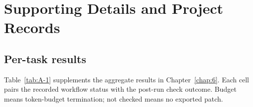 \chapter{Supporting Details and Project Records}\label{app:artefacts}

\section{Per-task results}\label{per-task-results}

Table~\ref{tab:A-1} supplements the aggregate results in Chapter~\ref{chap:6}. Each cell pairs the recorded workflow status with the post-run check outcome. Budget means token-budget termination; not checked means no exported patch.

